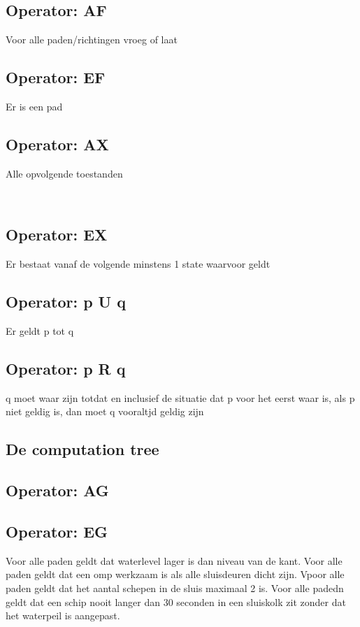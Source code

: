  \subsection{Operator: AF}
 Voor alle paden/richtingen vroeg of laat
 \subsection{Operator: EF}
 Er is een pad
 \subsection{Operator: AX}
 Alle opvolgende toestanden
 
 ~\cite{locke_2020}
 \subsection{Operator: EX}
 Er bestaat vanaf de volgende minstens 1 state waarvoor geldt
 \subsection{Operator: p U q}
 Er geldt p tot q
 ~\cite{gnsguides}
 \subsection{Operator: p R q}
 q moet waar zijn totdat en inclusief de situatie dat p voor het eerst waar is, als p niet geldig is, dan moet q vooraltjd geldig zijn
 
 
 \subsection{De computation tree}
 
 \subsection{Operator: AG}
 
 \subsection{Operator: EG}
 
 
 Voor alle paden geldt dat waterlevel lager is dan niveau van de kant.
 Voor alle paden geldt dat een omp werkzaam is als alle sluisdeuren dicht zijn.
 Vpoor alle paden geldt dat het aantal schepen in de sluis maximaal 2 is.
 Voor alle padedn  geldt dat een schip nooit langer dan 30 seconden in een sluiskolk zit zonder dat het waterpeil is aangepast.
